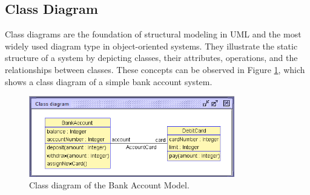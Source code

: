 
\subsection{Class Diagram}
Class diagrams are the foundation of structural modeling in UML and the most widely 
used diagram type in object-oriented systems. They illustrate the static structure 
of a system by depicting classes, their attributes, operations, and the relationships 
between classes. These concepts can be observed in Figure \ref{fig:class_diagram_bank_account_model}, 
which shows a class diagram of a simple bank account system.

\begin{figure}
    \begin{center}
        \includegraphics[width=0.8\textwidth]{figures/c1/BankAccount/BankAccount_ClassDiagram.png}
        \caption{Class diagram of the Bank Account Model.}
        \label{fig:class_diagram_bank_account_model}
    \end{center}
\end{figure}

